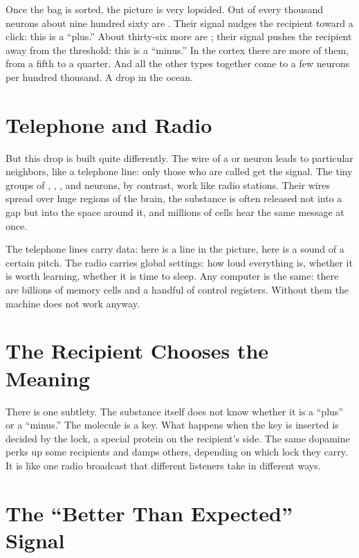 Once the bag is sorted, the picture is very lopsided. Out of every thousand neurons about nine hundred sixty are . Their signal nudges the recipient toward a click: this is a ``plus.'' About thirty-six more are ; their signal pushes the recipient away from the threshold: this is a ``minus.'' In the cortex there are more of them, from a fifth to a quarter. And all the other types together come to a few neurons per hundred thousand. A drop in the ocean.

\section*{Telephone and Radio}

But this drop is built quite differently. The wire of a  or  neuron leads to particular neighbors, like a telephone line: only those who are called get the signal. The tiny groups of , , , and  neurons, by contrast, work like radio stations. Their wires spread over huge regions of the brain, the substance is often released not into a gap but into the space around it, and millions of cells hear the same message at once.

The telephone lines carry data: here is a line in the picture, here is a sound of a certain pitch. The radio carries global settings: how loud everything is, whether it is worth learning, whether it is time to sleep. Any computer is the same: there are billions of memory cells and a handful of control registers. Without them the machine does not work anyway.

\section*{The Recipient Chooses the Meaning}

There is one subtlety. The substance itself does not know whether it is a ``plus'' or a ``minus.'' The molecule is a key. What happens when the key is inserted is decided by the lock, a special protein on the recipient's side. The same dopamine perks up some recipients and damps others, depending on which lock they carry. It is like one radio broadcast that different listeners take in different ways.

\section*{The ``Better Than Expected'' Signal}

